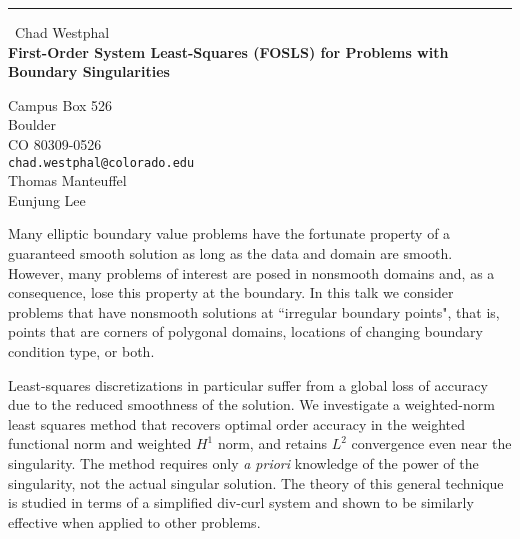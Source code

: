 \documentclass{report}
\begin{document}
\begin{center}
\rule{6in}{1pt} \
{\large Chad Westphal \\
{\bf First-Order System Least-Squares (FOSLS) for Problems with Boundary Singularities}}

Campus Box 526 \\ Boulder \\ CO 80309-0526
\\
{\tt chad.westphal@colorado.edu}\\
Thomas Manteuffel\\
Eunjung Lee\end{center}

Many elliptic boundary value problems have the fortunate property of a
guaranteed smooth solution as long as the data and domain are smooth.
However, many problems of interest are posed in nonsmooth domains and, as
a consequence, lose this property at the boundary. In this talk we
consider problems that have nonsmooth solutions at ``irregular boundary
points", that is, points that are corners of polygonal domains, locations
of changing boundary condition type, or both.

Least-squares discretizations in particular suffer from a global loss of
accuracy due to the reduced smoothness of the solution. We investigate a
weighted-norm least squares method that recovers optimal order accuracy
in the weighted functional norm and weighted $H^1$ norm, and retains
$L^2$ convergence even near the singularity. The method requires only
{\em a priori} knowledge of the power of the singularity, not the actual
singular solution. The theory of this general technique is studied in
terms of a simplified div-curl system and shown to be similarly effective
when applied to other problems.
\end{document}
